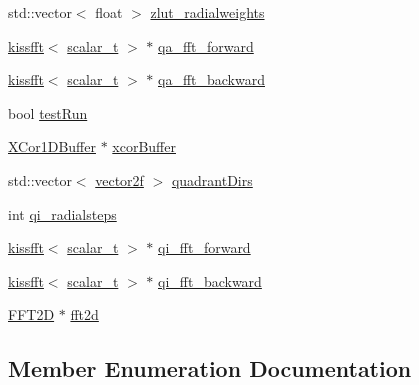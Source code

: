 \begin{DoxyCompactItemize}
\item 
std\+::vector$<$ float $>$ \hyperlink{class_c_p_u_tracker_a0512849e34777963ac4d380682f804a3}{zlut\+\_\+radialweights}
\item 
\hyperlink{classkissfft}{kissfft}$<$ \hyperlink{scalar__types_8h_a03fcef84665498b9cfcf9c7cc25574e9}{scalar\+\_\+t} $>$ $\ast$ \hyperlink{class_c_p_u_tracker_af3a10b319bc4de18d2429f9e30544c4a}{qa\+\_\+fft\+\_\+forward}
\item 
\hyperlink{classkissfft}{kissfft}$<$ \hyperlink{scalar__types_8h_a03fcef84665498b9cfcf9c7cc25574e9}{scalar\+\_\+t} $>$ $\ast$ \hyperlink{class_c_p_u_tracker_aca16d9dc92365498d092b937d6959d7e}{qa\+\_\+fft\+\_\+backward}
\item 
bool \hyperlink{class_c_p_u_tracker_a5dd04ccf64ee6885b2dc272553c29644}{test\+Run}
\item 
\hyperlink{class_x_cor1_d_buffer}{X\+Cor1\+D\+Buffer} $\ast$ \hyperlink{class_c_p_u_tracker_a50c41b873db189fb3cb01068025a2764}{xcor\+Buffer}
\item 
std\+::vector$<$ \hyperlink{std__incl_8h_aba974726076ec2d63a67114c536d123e}{vector2f} $>$ \hyperlink{class_c_p_u_tracker_ae155aab5f1ed07d8467818b915087b20}{quadrant\+Dirs}
\item 
int \hyperlink{class_c_p_u_tracker_a98d341a251610821e51783ce2dc4179c}{qi\+\_\+radialsteps}
\item 
\hyperlink{classkissfft}{kissfft}$<$ \hyperlink{scalar__types_8h_a03fcef84665498b9cfcf9c7cc25574e9}{scalar\+\_\+t} $>$ $\ast$ \hyperlink{class_c_p_u_tracker_a1b17351aec1bcd117d6f1e304904b282}{qi\+\_\+fft\+\_\+forward}
\item 
\hyperlink{classkissfft}{kissfft}$<$ \hyperlink{scalar__types_8h_a03fcef84665498b9cfcf9c7cc25574e9}{scalar\+\_\+t} $>$ $\ast$ \hyperlink{class_c_p_u_tracker_aa0ff71d20678c294eeeebb0b0eec1fc8}{qi\+\_\+fft\+\_\+backward}
\item 
\hyperlink{class_c_p_u_tracker_1_1_f_f_t2_d}{F\+F\+T2D} $\ast$ \hyperlink{class_c_p_u_tracker_a62ed72a32b90914199ba06c3df929dd6}{fft2d}
\end{DoxyCompactItemize}


\subsection{Member Enumeration Documentation}
